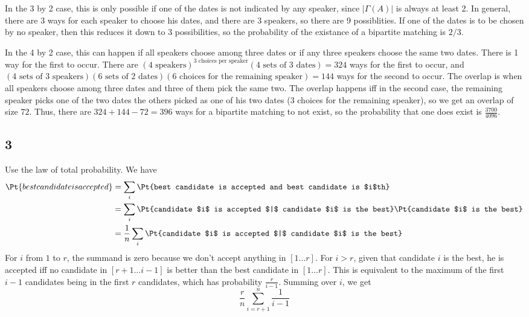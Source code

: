 \documentclass{article}
\begin{document}
In the 3 by 2 case, this is only possible if one of the dates is not indicated by any speaker, since $|\Gamma(A)|$ is always at least 2. In general, there are 3 ways for each speaker to choose his dates, and there are 3 speakers, so there are 9 possiblities. If one of the dates is to be chosen by no speaker, then this reduces it down to 3 possibilities, so the probability of the existance of a bipartite matching is $2/3$.

In the 4 by 2 case, this can happen if all speakers choose among three dates or if any three speakers choose the same two dates. There is 1 way for the first to occur. There are $(4\text{ speakers})^{3\text{ choices per speaker}}(4\text{ sets of 3 dates})=324$ ways for the first to occur, and $(4\text{ sets of 3 speakers})(6\text{ sets of 2 dates})(6\text{ choices for the remaining speaker})=144$ ways for the second to occur. The overlap is when all speakers choose among three dates and three of them pick the same two. The overlap happens iff in the second case, the remaining speaker picks one of the two dates the others picked as one of his two dates (3 choices for the remaining speaker), so we get an overlap of size $72$. Thus, there are $324+144-72=396$ ways for a bipartite matching to not exist, so the probability that one does exist is $\frac{3700}{4096}$.
\subsection*{3}
Use the law of total probability. We have 
\begin{align*}
\Pt{best candidate is accepted}&=\sum_i\Pt{best candidate is accepted and best candidate is $i$th}\\
&=\sum_i\Pt{candidate $i$ is accepted $|$ candidate $i$ is the best}\Pt{candidate $i$ is the best}\\
&=\frac{1}{n}\sum_i\Pt{candidate $i$ is accepted $|$ candidate $i$ is the best}
\end{align*}
For $i$ from $1$ to $r$, the summand is zero because we don't accept anything in $[1\ldots r]$. For $i>r$, given that candidate $i$ is the best, he is accepted iff no candidate in $[r+1\ldots i-1]$ is better than the best candidate in $[1\ldots r]$. This is equivalent to the maximum of the first $i-1$ candidates being in the first $r$ candidates, which has probability $\frac{r}{i-1}$. Summing over $i$, we get 
$$\frac{r}{n}\sum_{i=r+1}^n\frac{1}{i-1}$$
\end{document}

